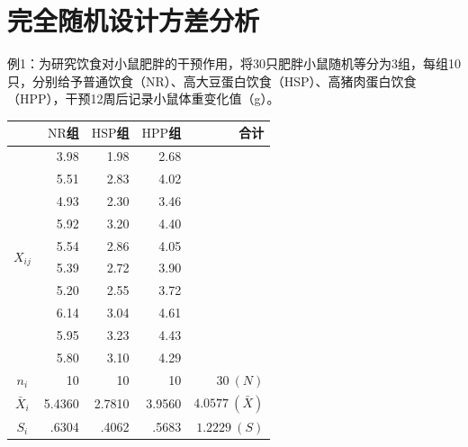 \section{完全随机设计方差分析}
例1：为研究饮食对小鼠肥胖的干预作用，将30只肥胖小鼠随机等分为3组，每组10只，分别给予普通饮食（NR）、高大豆蛋白饮食（HSP）、高猪肉蛋白饮食（HPP），干预12周后记录小鼠体重变化值（g）。
\par\noindent\begin{minipage}{\linewidth}
\begin{center}\begin{tabular}{crrrr}
\toprule &$\mathrm{NR}$组&$\mathrm{HSP}$组&$\mathrm{HPP}$组&合计\\\midrule
\multirow{10}{*}{$X_{ij}$}&3.98&1.98&2.68&\\
&5.51&2.83&4.02&\\&4.93&2.30&3.46&\\&5.92&3.20&4.40&\\
&5.54&2.86&4.05&\\&5.39&2.72&3.90&\\&5.20&2.55&3.72&\\
&6.14&3.04&4.61&\\&5.95&3.23&4.43&\\&5.80&3.10&4.29&\\\midrule
$n_i$&10&10&10&$30\ (N)$\\
$\bar X_i$&5.4360&2.7810&3.9560&$4.0577\ (\bar X)$\\
$S_i$&.6304&.4062&.5683&$1.2229\ (S)$\\\bottomrule
\end{tabular}\end{center}
\end{minipage}\par\medskip

